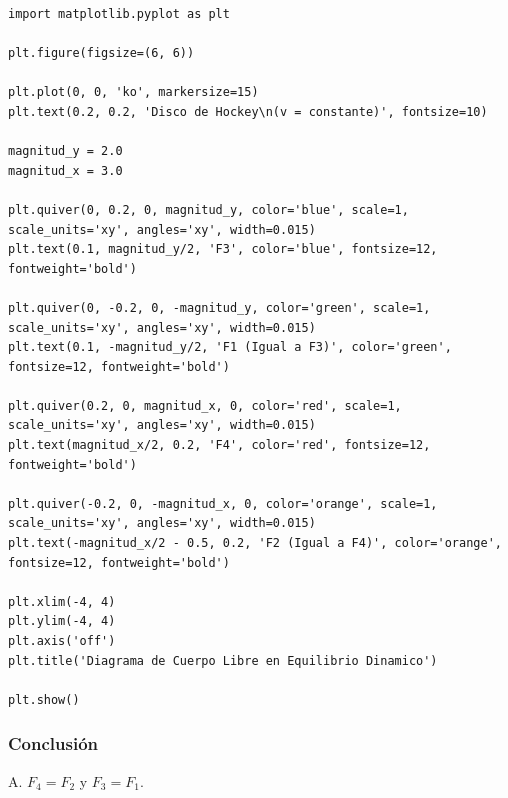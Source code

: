 \documentclass[12pt, a4paper]{article}
\begin{document}
\begin{lstlisting}
import matplotlib.pyplot as plt

plt.figure(figsize=(6, 6))

plt.plot(0, 0, 'ko', markersize=15)
plt.text(0.2, 0.2, 'Disco de Hockey\n(v = constante)', fontsize=10)

magnitud_y = 2.0
magnitud_x = 3.0

plt.quiver(0, 0.2, 0, magnitud_y, color='blue', scale=1, scale_units='xy', angles='xy', width=0.015)
plt.text(0.1, magnitud_y/2, 'F3', color='blue', fontsize=12, fontweight='bold')

plt.quiver(0, -0.2, 0, -magnitud_y, color='green', scale=1, scale_units='xy', angles='xy', width=0.015)
plt.text(0.1, -magnitud_y/2, 'F1 (Igual a F3)', color='green', fontsize=12, fontweight='bold')

plt.quiver(0.2, 0, magnitud_x, 0, color='red', scale=1, scale_units='xy', angles='xy', width=0.015)
plt.text(magnitud_x/2, 0.2, 'F4', color='red', fontsize=12, fontweight='bold')

plt.quiver(-0.2, 0, -magnitud_x, 0, color='orange', scale=1, scale_units='xy', angles='xy', width=0.015)
plt.text(-magnitud_x/2 - 0.5, 0.2, 'F2 (Igual a F4)', color='orange', fontsize=12, fontweight='bold')

plt.xlim(-4, 4)
plt.ylim(-4, 4)
plt.axis('off')
plt.title('Diagrama de Cuerpo Libre en Equilibrio Dinamico')

plt.show()
\end{lstlisting}

\subsubsection*{Conclusión}

A. $F_4 = F_2$ y $F_3 = F_1$.
\end{document}
